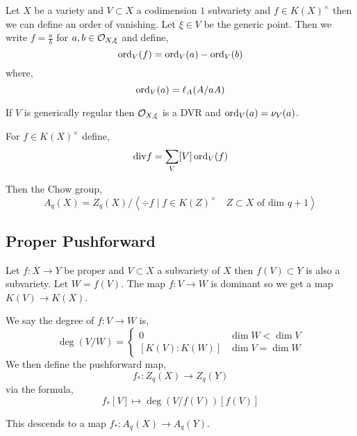 \documentclass[12pt]{article}
\begin{document}
Let $X$ be a variety and $V \subset X$ a codimension $1$ subvariety and $f \in K(X)^\times$ then we can define an order of vanishing. Let $\xi \in V$ be the generic point. Then we write $f = \frac{a}{b}$ for $a,b \in \mathcal{O}_{X, \xi}$ and define,
\[ \operatorname{\mathrm{ord}}_V(f) = \operatorname{\mathrm{ord}}_V(a) - \operatorname{\mathrm{ord}}_V(b) \]
where,
\[ \operatorname{\mathrm{ord}}_V(a) = \ell_A(A / a A) \]

\begin{rmk}
If $V$ is generically regular then $\mathcal{O}_{X, \xi}$ is a DVR and $\operatorname{\mathrm{ord}}_V(a) = \nu_V(a)$. 
\end{rmk}

\begin{defn}
For $f \in K(X)^\times$ define,
\[ \mathrm{div}{f} = \sum_{V} [V] \operatorname{\mathrm{ord}}_V(f) \]
\end{defn}

\begin{defn}
Then the Chow group,
\[ A_q(X) = Z_q(X) / \left< \div{f} \mid f \in K(Z)^\times \quad Z \subset X \text{ of dim } q + 1 \right> \]
\end{defn}

\subsection{Proper Pushforward}

Let $f : X \to Y$ be proper and $V \subset X$ a subvariety of $X$ then $f(V) \subset Y$ is also a subvariety. Let $W = f(V)$. The map $f : V \to W$ is dominant so we get a map $K(V) \to K(X)$.

\begin{defn}
We say the degree of $f : V \to W$ is,
\[ \deg{(V/W)} = \begin{cases}
0 & \dim{W} < \dim{V}
\\
[K(V) : K(W)] & \dim{V} = \dim{W} 
\end{cases} \]
We then define the pushforward map,
\[ f_* : Z_q(X) \to Z_q(Y) \]
via the formula,
\[ f_* [V] \mapsto \deg{(V / f(V))} [f(V)] \]
\end{defn}

\begin{theorem}
This descends to a map $f_* : A_q(X) \to A_q(Y)$.
\end{theorem}
\end{document}
